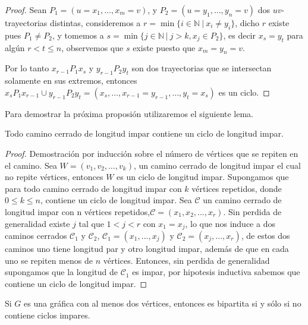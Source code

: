 \begin{proof}
    Sean $P_1=(u=x_1,\dots,x_m=v)$, y $P_2=(u=y_1,\dots,y_n=v)$ dos $uv$-trayectorias distintas, consideremos a
    $r=\min\{i\in\mathbb{N}\ |\ x_i\neq y_i\}$, dicho $r$ existe pues $P_1\neq P_2$, y tomemos a
    $s=\min\{j\in\mathbb{N}\ |\ j>k, x_j\in P_2\}$, es decir $x_s=y_t$ para alg\'un $r<t\leq n$, observemos que $s$
    existe puesto que $x_m=y_n=v$.

    Por lo tanto $x_{r-1}P_1x_s$ y $y_{r-1}P_2y_t$  son dos trayectorias que se intersectan solamente en sus
    extremos, entonces $x_sP_1x_{r-1}\cup y_{r-1}P_2y_t=(x_s,\dots,x_{r-1}=y_{r-1},\dots,y_t=x_s)$ es un ciclo.
\end{proof}

Para demostrar la pr\'oxima proposi\'on utilizaremos el siguiente lema.

\begin{lema}
    \label{lem1}
    Todo camino cerrado de longitud impar contiene un ciclo de longitud impar.
\end{lema}

\begin{proof}
    Demostraci\'on por inducci\'on sobre el n\'umero de v\'ertices que se repiten en el camino.
    Sea $W = (v_1,v_2, \dots, v_k)$, un camino cerrado de longitud impar el cual no repite v\'ertices, entonces $W$
    es un ciclo de longitud impar.
    Supongamos que para todo camino cerrado de longitud impar con $k$ v\'ertices repetidos, donde $0\le k \le n$,
    contiene un ciclo de longitud impar.
    Sea $\mathscr{C}$ un camino cerrado de longitud impar con n v\'ertices repetidos,$\mathscr{C}= (x_1,x_2, ... ,
    x_r)$.
    Sin perdida de generalidad existe $j$ tal que $1<j<r$ con $x_1 = x_j$, lo que nos induce a dos caminos cerrados
    $\mathscr{C}_1$ y $\mathscr{C}_2$,
    $\mathscr{C}_1= (x_1, ..., x_j)$ y
    $\mathscr{C}_2= (x_j, ..., x_r)$,
    de estos dos caminos uno tiene longitud par y otro longitud impar, adem\'as de que en cada uno se repiten menos
    de $n$ v\'ertices.
    Entonces, sin perdida de generalidad supongamos que la longitud de $\mathscr{C}_1$ es impar, por hipotesis
    inductiva sabemos que contiene un ciclo de longitud impar.
\end{proof}


\begin{proposicion}
    Si $G$ es una gr\'afica con al menos dos v\'ertices, entonces es bipartita si y s\'olo si no contiene ciclos
    impares.
\end{proposicion}


